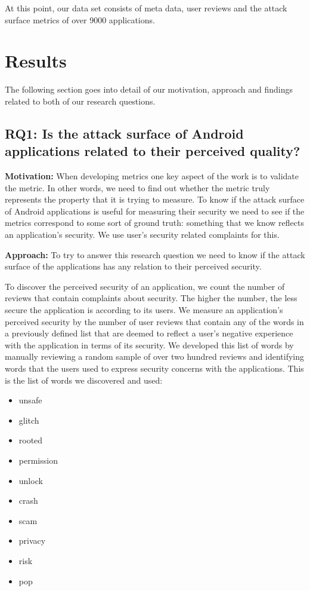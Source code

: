 \documentclass{sig-alternate}
\begin{document}
At this point, our data set consists of meta data, user reviews and the attack surface metrics of over 9000 applications.

\section{Results}

The following section goes into detail of our motivation, approach and findings related to both of our research questions. 

\subsection{RQ1: Is the attack surface of Android applications related to their perceived quality?}

\textbf{Motivation:} When developing metrics one key aspect of the work is to validate the metric. In other words, we need to find out whether the metric truly represents the property that it is trying to measure. To know if the attack surface of Android applications is useful for measuring their security we need to see if the metrics correspond to some sort of ground truth: something that we know reflects an application's security. We use user's security related complaints for this.

\textbf{Approach:} To try to answer this research question we need to know if the attack surface of the applications has any relation to their perceived security.

To discover the perceived security of an application, we count the number of reviews that contain complaints about security. The higher the number, the less secure the application is according to its users. We measure an application's perceived security by the number of user reviews that contain any of the words in a previously defined list that are deemed to reflect a user's negative experience with the application in terms of its security. We developed this list of words by manually reviewing a random sample of over two hundred reviews and identifying words that the users used to express security concerns with the applications. This is the list of words we discovered and used: 

\begin{itemize}
\item unsafe
\item glitch
\item rooted
\item permission
\item unlock
\item crash
\item scam
\item privacy
\item risk
\item pop
\end{itemize}
\end{document}
